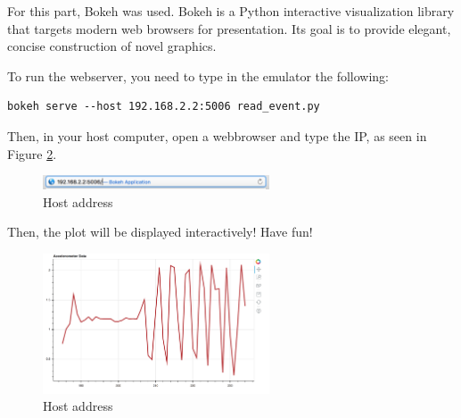 For this part, Bokeh was used. Bokeh is a Python interactive visualization library that targets modern web browsers for presentation. Its goal is to provide elegant, concise construction of novel graphics.

To run the webserver, you need to type in the emulator the following:

   \begin{tcolorbox}
        \begin{verbatim}
bokeh serve --host 192.168.2.2:5006 read_event.py
        \end{verbatim}
    \end{tcolorbox}


Then, in your host computer, open a webbrowser and type the IP, as seen in Figure \ref{fig:bokeh}.

\begin{figure}[h!]
    \centering
    \includegraphics[width=0.6\textwidth]{img/bokeh.png}
    \caption{Host address}
    \label{fig:bokeh}
\end{figure}

Then, the plot will be displayed interactively! Have fun!

\begin{figure}[h!]
    \centering
    \includegraphics[width=0.6\textwidth]{img/acc.png}
    \caption{Host address}
    \label{fig:bokeh}
\end{figure}



